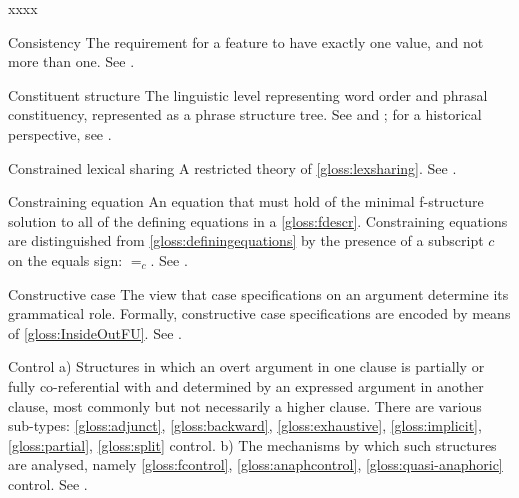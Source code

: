 \documentclass[output=paper,colorlinks,citecolor=brown]{langscibook}
\begin{document}
\begin{labeling}{xxxx}
\item[Consistency\namedlabel{gloss:Consistency}{Consistency}] The requirement for a feature to have exactly one value, and not more than one.  See \citetv[\ref{sect:uniqueness}]{chapters/CoreConcepts}.

\item[Constituent structure\namedlabel{gloss:Cstr}{Constituent structure}\namedlabel{gloss:cstr}{constituent structure}\namedlabel{gloss:cstrs}{constituent structures}] The linguistic level representing word order and phrasal constituency, represented as a phrase structure tree.  See \citetv[\ref{sect:intro:c-structure}]{chapters/Intro} and ; for a historical perspective, see \citetv[\ref{sec:Historical:syn-change}]{chapters/Historical}.

\item[Constrained lexical sharing] A restricted theory of \ref{gloss:lexsharing}.  See \citetv[\ref{sec:Historical:lex-share}]{chapters/Historical}.

\item[Constraining equation\namedlabel{gloss:ConstrainingEquation}{Constraining equation}\namedlabel{gloss:constrainingequations}{constraining equations}] An equation that must hold of the minimal f-structure solution to all of the defining equations in a \ref{gloss:fdescr}.  Constraining equations are distinguished from \ref{gloss:definingequations} by the presence of a subscript $c$ on the equals sign: $=_c$. See \citetv[\ref{sect:constequ}]{chapters/CoreConcepts}.

\item[Constructive case] The view that case specifications on an argument determine its grammatical role. Formally, constructive case specifications are encoded by means of \ref{gloss:InsideOutFU}.  See .

\item[Control\namedlabel{gloss:Control}{Control}\namedlabel{gloss:control}{control}] a) Structures in which an overt argument in one clause is partially or fully co-referential with and determined by an expressed argument in another clause, most commonly but not necessarily a higher clause.  There are various sub-types: \ref{gloss:adjunct}, \ref{gloss:backward}, \ref{gloss:exhaustive}, \ref{gloss:implicit}, \ref{gloss:partial}, \ref{gloss:split} control. b) The mechanisms by which such structures are analysed, namely \ref{gloss:fcontrol}, \ref{gloss:anaphcontrol}, \ref{gloss:quasi-anaphoric} control. See .
  

\end{labeling}
\end{document}

